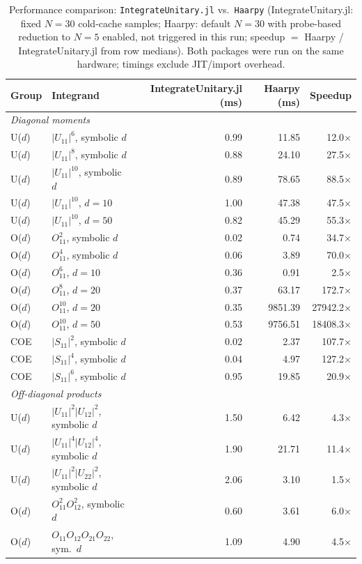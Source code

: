 \documentclass[manuscript,screen]{acmart}
\begin{document}
\begin{table}[ht]
  \centering
  \caption{Performance comparison: \texttt{IntegrateUnitary.jl} vs.\ \texttt{Haarpy}
  (IntegrateUnitary.jl: fixed $N=30$ cold-cache samples; Haarpy: default $N=30$ with
  probe-based reduction to $N=5$ enabled, not triggered in this run; speedup
  $=$ Haarpy / IntegrateUnitary.jl from row
  medians). Both packages were run on the same hardware; timings exclude
  JIT/import overhead.}
  \label{tab:haarpy_comparison}
  \begin{tabular}{llrrr}
    \hline
    Group & Integrand & IntegrateUnitary.jl (ms) & Haarpy (ms) & Speedup \\
    \hline
    \multicolumn{5}{l}{\emph{Diagonal moments}} \\
    U($d$) & $|U_{11}|^6$, symbolic $d$ & 0.99 & 11.85 & 12.0$\times$ \\
    U($d$) & $|U_{11}|^8$, symbolic $d$ & 0.88 & 24.10 & 27.5$\times$ \\
    U($d$) & $|U_{11}|^{10}$, symbolic $d$ & 0.89 & 78.65 & 88.5$\times$ \\
    U($d$) & $|U_{11}|^{10}$, $d=10$ & 1.00 & 47.38 & 47.5$\times$ \\
    U($d$) & $|U_{11}|^{10}$, $d=50$ & 0.82 & 45.29 & 55.3$\times$ \\
    \hline
    O($d$) & $O_{11}^2$, symbolic $d$ & 0.02 & 0.74 & 34.7$\times$ \\
    O($d$) & $O_{11}^4$, symbolic $d$ & 0.06 & 3.89 & 70.0$\times$ \\
    O($d$) & $O_{11}^6$, $d=10$ & 0.36 & 0.91 & 2.5$\times$ \\
    O($d$) & $O_{11}^8$, $d=20$ & 0.37 & 63.17 & 172.7$\times$ \\
    O($d$) & $O_{11}^{10}$, $d=20$ & 0.35 & 9851.39 & 27942.2$\times$ \\
    O($d$) & $O_{11}^{10}$, $d=50$ & 0.53 & 9756.51 & 18408.3$\times$ \\
    \hline
    COE & $|S_{11}|^2$, symbolic $d$ & 0.02 & 2.37 & 107.7$\times$ \\
    COE & $|S_{11}|^4$, symbolic $d$ & 0.04 & 4.97 & 127.2$\times$ \\
    COE & $|S_{11}|^6$, symbolic $d$ & 0.95 & 19.85 & 20.9$\times$ \\
    \hline
    \multicolumn{5}{l}{\emph{Off-diagonal products}} \\
    U($d$) & $|U_{11}|^2|U_{12}|^2$, symbolic $d$ & 1.50 & 6.42 & 4.3$\times$ \\
    U($d$) & $|U_{11}|^4|U_{12}|^4$, symbolic $d$ & 1.90 & 21.71 & 11.4$\times$ \\
    U($d$) & $|U_{11}|^2|U_{22}|^2$, symbolic $d$ & 2.06 & 3.10 & 1.5$\times$ \\
    \hline
    O($d$) & $O_{11}^2 O_{12}^2$, symbolic $d$ & 0.60 & 3.61 & 6.0$\times$ \\
    O($d$) & $O_{11}O_{12}O_{21}O_{22}$, sym.\ $d$ & 1.09 & 4.90 & 4.5$\times$ \\
    \hline
\end{tabular}
\end{table}
\end{document}
